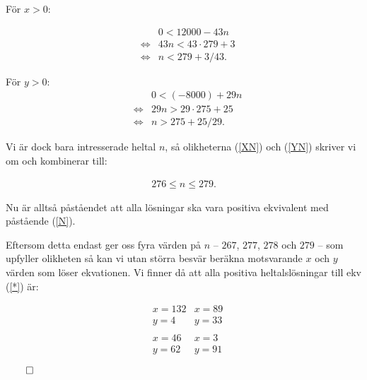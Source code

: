 \documentclass{article}
\begin{document}
För $x > 0$:

\begin{align*}
  & &0 < 12000 - 43n \\
  &\iff &43n < 43 \cdot 279 + 3 \\
  &\iff &n < 279 + 3 / 43 \label{XN}\text{.} \tag{XN}
\end{align*}

För $y > 0$:
\begin{align*}
  & &0 < (-8000) + 29n \\
  &\iff &29n > 29 \cdot 275 + 25 \\
  &\iff &n > 275 + 25 / 29\text{.} \label{YN}\tag{YN}
\end{align*}

Vi är dock bara intresserade heltal $n$, så olikheterna (\ref{XN}) och (\ref{YN}) skriver vi om och kombinerar till:

\begin{gather*}
  276 \leq n \leq 279\text{.} \label{N}\tag{N}
\end{gather*}

Nu är alltså påståendet att alla lösningar ska vara positiva ekvivalent med påstående (\ref{N}).

Eftersom detta endast ger oss fyra värden på $n$ -- $267$, $277$, $278$ och $279$ -- som upfyller olikheten så kan vi utan störra besvär beräkna motsvarande $x$ och $y$ värden som löser ekvationen. Vi finner då att alla positiva heltalslösningar till ekv (\ref{*}) är:

\begin{align*}
  &x = 132   &x=89 \\
  &y = 4     &y=33 \\
  \\
  &x = 46    &x=3 \\
  &y = 62    &y=91
\end{align*}

\centerline{$\qed$}
\end{document}
